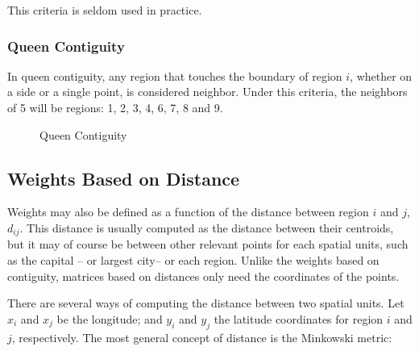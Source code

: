 This criteria is seldom used in practice. 

\subsubsection{Queen Contiguity}

In queen contiguity, any region that touches the boundary of region $i$, whether on a side or a single point, is considered neighbor. Under this criteria, the neighbors of 5 will be regions: 1, 2, 3, 4, 6, 7, 8 and 9.

\begin{figure}[h]
\caption{Queen Contiguity}
\label{fig:Queen_cont_grid}
\centering
{}
\end{figure}


\subsection{Weights Based on Distance}

Weights may also be defined as a function of the distance between region $i$ and $j$, $d_{ij}$. This distance is usually computed as the distance between their centroids, but it may of course be between other relevant points for each spatial units, such as the capital -- or largest city-- or each region. Unlike the weights based on contiguity, matrices based on distances only need the coordinates of the points.

There are several ways of computing the distance between two spatial units. Let $x_i$ and $x_j$ be the longitude; and $y_i$ and $y_j$ the latitude coordinates for region $i$ and $j$, respectively. The most general concept of distance is the Minkowski metric:

